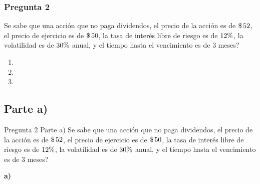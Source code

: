 \documentclass{beamer}
\begin{document}
\newcommand{\deunob}{\decimalx{\bseis}}
\newcommand{\dedosb}{\decimalx{\bsiete}}

\pgfmathsetmacro{\bnueve}{\Kuno*\bocho*\phiddosb}
\pgfmathsetmacro{\bdiez}{\Stres*\phidunob}
\pgfmathsetmacro{\bonce}{ \bdiez- \bnueve}



\newcommand{\Pregdos}{Se sabe que una acción que no paga dividendos, el precio de la 
acción es de $\dinero{\Stres}$, el precio de ejercicio es de $\dinero{\Kuno}$, la tasa de interés libre de riesgo es de $\porcentaje{\rdoce}$, la 
volatilidad es de $\porcentaje{\sigmaPuno}$ anual, y el tiempo hasta el vencimiento es de 3 meses?
  }



\begin{frame}
  \frametitle{Pregunta 2}
  \justify
  \Pregdos
  \vspace{1em}

\begin{enumerate}[label=\textbf{\alph*)}]
  \item \Pregunoa
  \item \Pregunob
  \item \Pregunoc
\end{enumerate}

\end{frame}

\subsection{Parte a)}

\begin{frame}{Pregunta 2 Parte a)}
  \justify
  \Pregdos
  \vspace{1em}
  
  \textbf{a)}  \Pregunoa
  
\end{frame}
\end{document}
